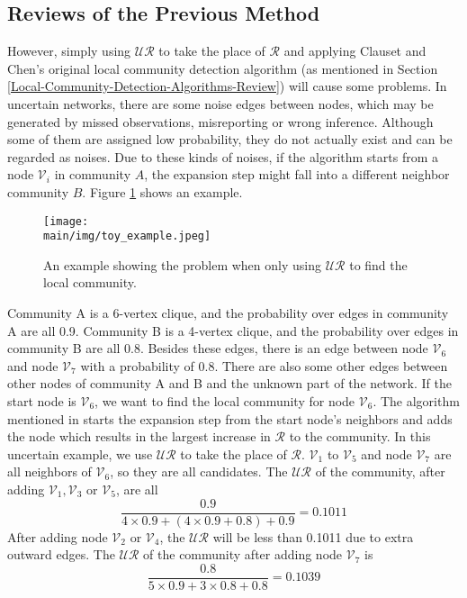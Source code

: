 \documentclass[\main/thesis.tex]{subfiles}
\begin{document}
\subsection{Reviews of the Previous Method}
However, simply using $\mathcal{UR}$ to take the place of $\mathcal{R}$ and applying Clauset and Chen's original local community detection algorithm (as mentioned in Section \ref{Local-Community-Detection-Algorithms-Review}) will cause some problems. In uncertain networks, there are some noise edges between nodes, which may be generated by missed observations, misreporting or wrong inference. Although some of them are assigned low probability, they do not actually exist and can be regarded as noises. Due to these kinds of noises, if the algorithm starts from a node $\mathcal{V}_i$ in community $A$, the expansion step might fall into a different neighbor community $B$. Figure \ref{problem_example} shows an example.

\begin{figure}
\centering
\texttt{[image: \\main/img/toy\_example.jpeg]}
\caption{An example showing the problem when only using $\mathcal{UR}$ to find the local community.}
\label{problem_example}
\end{figure}

Community A is a 6-vertex clique, and the probability over edges in community A are all 0.9. Community B is a 4-vertex clique, and the probability over edges in community B are all 0.8. Besides these edges, there is an edge between node $\mathcal{V}_6$ and node $\mathcal{V}_7$ with a probability of 0.8. There are also some other edges between other nodes of community A and B and the unknown part of the network. If the start node is $\mathcal{V}_6$, we want to find the local community for node $\mathcal{V}_6$. The algorithm mentioned in \cite{clauset2005finding,chen2009detecting} starts the expansion step from the start node's neighbors and adds the node which results in the largest increase in $\mathcal{R}$ to the community. In this uncertain example, we use $\mathcal{UR}$ to take the place of $\mathcal{R}$. $\mathcal{V}_1$ to $\mathcal{V}_5$ and node $\mathcal{V}_7$ are all neighbors of $\mathcal{V}_6$, so they are all candidates. The $\mathcal{UR}$ of the community, after adding $\mathcal{V}_1, \mathcal{V}_3$ or $\mathcal{V}_5$, are all 
\begin{equation}
\frac{0.9}{4\times0.9+(4\times0.9+0.8)+0.9}=0.1011
\label{value-after-add-135}
\end{equation}
After adding node $\mathcal{V}_2$ or $\mathcal{V}_4$, the $\mathcal{UR}$ will be less than 0.1011 due to extra outward edges. The $\mathcal{UR}$ of the community after adding node $\mathcal{V}_7$ is 
\begin{equation}
\frac{0.8}{5\times0.9+3\times0.8+0.8}=0.1039
\end{equation}
\end{document}

